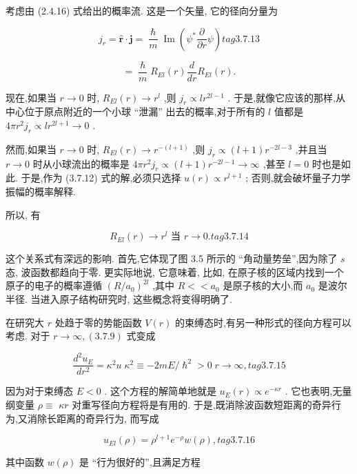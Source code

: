 考虑由 (2.4.16) 式给出的概率流. 这是一个矢量, 它的径向分量为

$$
{j}_{r} = \widehat{\mathbf{r}} \cdot \mathbf{j} = \frac{\hslash }{m}\operatorname{Im}\left( {{\psi }^{ * }\frac{\partial }{\partial r}\psi }\right) tag{3. 7.13}
$$

$$
= \frac{\hslash }{m}{R}_{El}\left( r\right) \frac{d}{dr}{R}_{El}\left( r\right) .
$$

现在,如果当 $r \rightarrow 0$ 时, ${R}_{El}\left( r\right) \rightarrow {r}^{l}$ ,则 ${j}_{r} \propto l{r}^{{2l} - 1}$ . 于是,就像它应该的那样,从中心位于原点附近的一个小球 “泄漏” 出去的概率,对于所有的 $l$ 值都是 ${4\pi }{r}^{2}{j}_{r} \propto l{r}^{{2l} + 1} \rightarrow 0$ .

然而,如果当 $r \rightarrow 0$ 时, ${R}_{El}\left( r\right) \rightarrow {r}^{-\left( {l + 1}\right) }$ ,则 ${j}_{r} \propto \left( {l + 1}\right) {r}^{-{2l} - 3}$ ,并且当 $r \rightarrow 0$ 时从小球流出的概率是 ${4\pi }{r}^{2}{j}_{r} \propto \left( {l + 1}\right) {r}^{-{2l} - 1} \rightarrow \infty$ ,甚至 $l = 0$ 时也是如此. 于是,作为 (3.7.12) 式的解,必须只选择 $u\left( r\right) \propto {r}^{l + 1}$ ; 否则,就会破坏量子力学振幅的概率解释.

所以, 有

$$
{R}_{El}\left( r\right) \rightarrow {r}^{l}\text{ 当 }r \rightarrow 0. tag{3. 7.14}
$$

这个关系式有深远的影响. 首先,它体现了图 3.5 所示的 “角动量势垒”,因为除了 $s$ 态, 波函数都趋向于零. 更实际地说, 它意味着, 比如, 在原子核的区域内找到一个原子的电子的概率遵循 ${\left( R/{a}_{0}\right) }^{2l}$ ,其中 $R < < {a}_{0}$ 是原子核的大小,而 ${a}_{0}$ 是波尔半径. 当进入原子结构研究时, 这些概念将变得明确了.

在研究大 $r$ 处趋于零的势能函数 $V\left( r\right)$ 的束缚态时,有另一种形式的径向方程可以考虑. 对于 $r \rightarrow \infty ,\left( {3.7.9}\right)$ 式变成

$$
\frac{{d}^{2}{u}_{E}}{d{r}^{2}} = {\kappa }^{2}u\;{\kappa }^{2} \equiv - {2mE}/{\hslash }^{2} > 0\;r \rightarrow \infty , tag{3. 7.15}
$$

因为对于束缚态 $E < 0$ . 这个方程的解简单地就是 ${u}_{E}\left( r\right) \propto {e}^{-{\kappa r}}$ . 它也表明,无量纲变量 $\rho \equiv$ ${\kappa r}$ 对重写径向方程将是有用的. 于是,既消除波函数短距离的奇异行为,又消除长距离的奇异行为, 而写成

$$
{u}_{El}\left( \rho \right) = {\rho }^{l + 1}{e}^{-\rho }w\left( \rho \right) , tag{3. 7.16}
$$

其中函数 $w\left( \rho \right)$ 是 “行为很好的”,且满足方程

